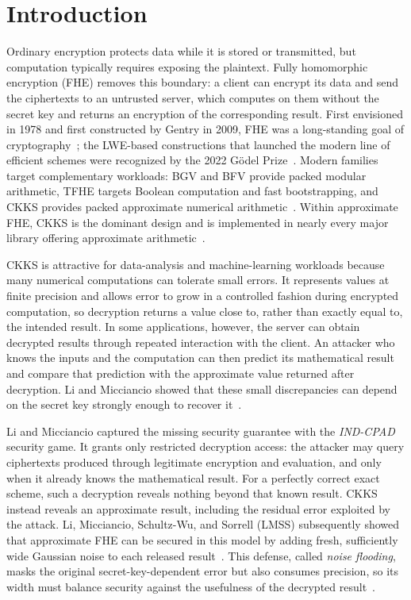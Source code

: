 \section{Introduction}
\label{sec:introduction}

Ordinary encryption protects data while it is stored or transmitted, but
computation typically requires exposing the plaintext.
Fully homomorphic encryption (FHE) removes this boundary: a client can encrypt
its data and send the ciphertexts to an untrusted server, which computes on them
without the secret key and returns an encryption of the corresponding result.
First envisioned in 1978 and first constructed by Gentry in 2009, FHE was a
long-standing goal of cryptography~\cite{rad78,gentry09}; the LWE-based
constructions that launched the modern line of efficient schemes were
recognized by the 2022 G{\"o}del Prize~\cite{godel2022}.
Modern families target complementary workloads: BGV and BFV provide packed
modular arithmetic, TFHE targets Boolean computation and fast bootstrapping, and
CKKS provides packed approximate numerical
arithmetic~\cite{godel2022,fv12,tfhe,ckks}.
Within approximate FHE, CKKS is the dominant design and is implemented in
nearly every major library offering approximate arithmetic~\cite{heprofiler}.

CKKS is attractive for data-analysis and machine-learning workloads because
many numerical computations can tolerate small errors.
It represents values at finite precision and allows error to grow in a
controlled fashion during encrypted computation, so decryption returns a value
close to, rather than exactly equal to, the intended result.
In some applications, however, the server can obtain decrypted results through
repeated interaction with the client.
An attacker who knows the inputs and the computation can then predict its
mathematical result and compare that prediction with the approximate value
returned after decryption.
Li and Micciancio showed that these small discrepancies can depend on the secret
key strongly enough to recover it~\cite{lm}.

Li and Micciancio captured the missing security guarantee with the
\emph{IND-CPAD} security game.
It grants only restricted decryption access: the attacker may query ciphertexts
produced through legitimate encryption and evaluation, and only when it already
knows the mathematical result.
For a perfectly correct exact scheme, such a decryption reveals nothing beyond
that known result.
CKKS instead reveals an approximate result, including the residual error
exploited by the attack.
Li, Micciancio, Schultz-Wu, and Sorrell (LMSS) subsequently showed that
approximate FHE can be secured in this model by adding fresh, sufficiently wide
Gaussian noise to each released result~\cite{lmss}.
This defense, called \emph{noise flooding}, masks the original
secret-key-dependent error but also consumes precision, so its width must balance
security against the usefulness of the decrypted
result~\cite{costache2023precision,bergamaschi2025revisiting}.

